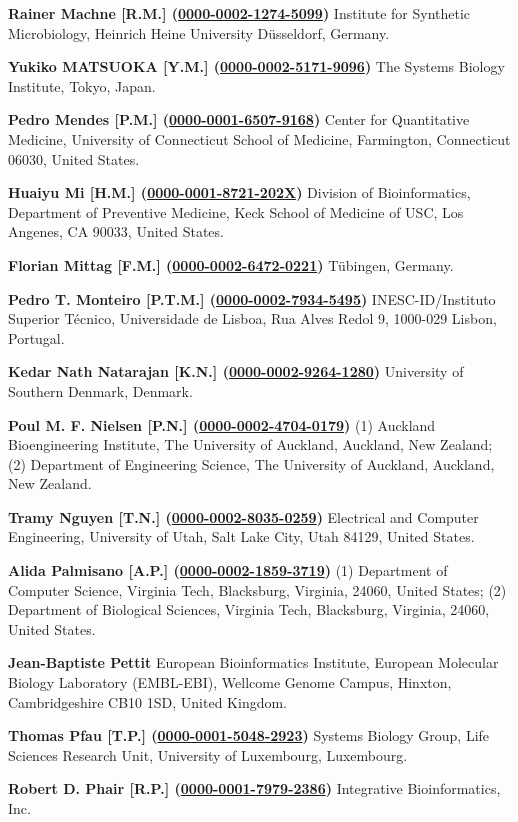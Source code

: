 \documentclass{sbml-paper}
\newcommand{\orcid}[1]{\href{https://orcid.org/#1}{#1}}
\begin{document}
\textbf{Rainer Machne [R.M.] (\orcid{0000-0002-1274-5099})} Institute for Synthetic Microbiology, Heinrich Heine University D\"{u}sseldorf, Germany.

\textbf{Yukiko MATSUOKA [Y.M.] (\orcid{0000-0002-5171-9096})} The Systems Biology Institute, Tokyo, Japan.

\textbf{Pedro Mendes [P.M.] (\orcid{0000-0001-6507-9168})} Center for Quantitative Medicine, University of Connecticut School of Medicine, Farmington, Connecticut 06030, United States.

\textbf{Huaiyu Mi [H.M.] (\orcid{0000-0001-8721-202X})} Division of Bioinformatics, Department of Preventive Medicine, Keck School of Medicine of USC, Los Angenes, CA 90033, United States.

\textbf{Florian Mittag [F.M.] (\orcid{0000-0002-6472-0221})} T\"{u}bingen, Germany.

\textbf{Pedro T. Monteiro [P.T.M.] (\orcid{0000-0002-7934-5495})} INESC-ID/Instituto Superior T\'{e}cnico, Universidade de Lisboa, Rua Alves Redol 9, 1000-029 Lisbon, Portugal.

\textbf{Kedar Nath Natarajan [K.N.] (\orcid{0000-0002-9264-1280})} University of Southern Denmark, Denmark.

\textbf{Poul M. F. Nielsen [P.N.] (\orcid{0000-0002-4704-0179})} (1) Auckland Bioengineering Institute, The University of Auckland, Auckland, New Zealand; (2) Department of Engineering Science, The University of Auckland, Auckland, New Zealand.

\textbf{Tramy Nguyen [T.N.] (\orcid{0000-0002-8035-0259})} Electrical and Computer Engineering, University of Utah, Salt Lake City, Utah 84129, United States.

\textbf{Alida Palmisano [A.P.] (\orcid{0000-0002-1859-3719})} (1) Department of Computer Science, Virginia Tech, Blacksburg, Virginia, 24060,  United States; (2) Department of Biological Sciences, Virginia Tech, Blacksburg, Virginia, 24060, United States.

\textbf{Jean-Baptiste Pettit} European Bioinformatics Institute, European Molecular Biology Laboratory (EMBL-EBI), Wellcome Genome Campus, Hinxton, Cambridgeshire CB10 1SD, United Kingdom.

\textbf{Thomas Pfau [T.P.] (\orcid{0000-0001-5048-2923})} Systems Biology Group, Life Sciences Research Unit, University of Luxembourg, Luxembourg.

\textbf{Robert D. Phair [R.P.] (\orcid{0000-0001-7979-2386})} Integrative Bioinformatics, Inc.
\end{document}
